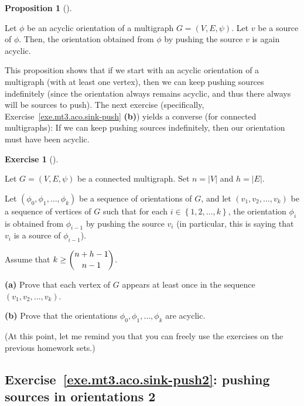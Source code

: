 \documentclass[numbers=enddot,12pt,final,onecolumn,notitlepage]{scrartcl}%
\newcounter{exer}
\theoremstyle{definition}
\newtheorem{prop}[theo]{Proposition}
\newenvironment{proposition}[1][]
{\begin{prop}[#1]\begin{leftbar}}
{\end{leftbar}\end{prop}}
\newtheorem{exmp}[exer]{Exercise}
\newenvironment{exercise}[1][]
{\begin{exmp}[#1]\begin{leftbar}}
{\end{leftbar}\end{exmp}}
\newcommand{\set}[1]{\left\{ #1 \right\}}
\newcommand{\abs}[1]{\left| #1 \right|}
\newcommand{\tup}[1]{\left( #1 \right)}
\begin{document}
\begin{proposition}
Let $\phi$ be an acyclic orientation of a multigraph
$G = \tup{V, E, \psi}$.
Let $v$ be a source of $\phi$.
Then, the orientation obtained from $\phi$
by pushing the source $v$ is again acyclic.
\end{proposition}

This proposition shows that if we start with an acyclic
orientation of a multigraph (with at least one vertex),
then we can keep pushing sources indefinitely (since
the orientation always remains acyclic, and thus there
always will be sources to push).
The next exercise (specifically,
Exercise~\ref{exe.mt3.aco.sink-push} \textbf{(b)})
yields a converse (for connected multigraphs):
If we can keep pushing sources indefinitely, then our
orientation must have been acyclic.

\begin{exercise} \label{exe.mt3.aco.sink-push}
Let $G = \tup{V, E, \psi}$ be a connected multigraph.
Set $n = \abs{V}$ and $h = \abs{E}$.

Let $\tup{\phi_0, \phi_1, \ldots, \phi_k}$ be a sequence of
orientations of $G$, and let
$\tup{v_1, v_2, \ldots, v_k}$ be a sequence of vertices of $G$
such that for each
$i \in \set{1, 2, \ldots, k}$, the orientation $\phi_i$
is obtained from $\phi_{i-1}$ by pushing the source $v_i$
(in particular, this is saying that $v_i$ is a source of
$\phi_{i-1}$).

Assume that $k \geq \dbinom{n+h-1}{n-1}$.

\textbf{(a)}
Prove that each vertex of $G$ appears at least once in the
sequence $\tup{v_1, v_2, \ldots, v_k}$.

\textbf{(b)}
Prove that the orientations $\phi_0, \phi_1, \ldots, \phi_k$
are acyclic.
\end{exercise}

(At this point, let me remind you that you can freely
use the exercises on the previous homework sets.)

\subsection{Exercise~\ref{exe.mt3.aco.sink-push2}:
pushing sources in orientations 2}
\end{document}
